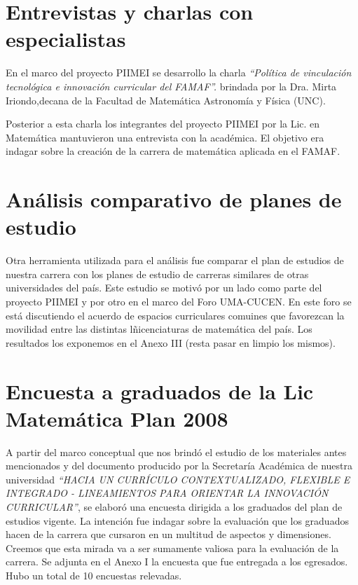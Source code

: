 \documentclass[a4paper,10pt,BCOR10mm,oneside,headsepline]{scrbook}
\begin{document}
\section{Entrevistas y charlas con especialistas}

En el marco del proyecto PIIMEI se desarrollo la charla \emph{“Política de vinculación tecnológica e innovación curricular del FAMAF”. } brindada por la Dra. Mirta Iriondo,decana de la Facultad de Matemática Astronomía y Física (UNC). 

Posterior a esta charla los integrantes del proyecto PIIMEI por la Lic. en Matemática mantuvieron una entrevista con la académica. El objetivo era indagar sobre la creación de la carrera de matemática aplicada en el FAMAF.

\section{Análisis comparativo de planes de estudio}

Otra herramienta utilizada para el análisis fue comparar el plan de estudios de nuestra carrera con los planes de estudio de carreras similares de otras universidades del país. Este estudio se motivó por un lado  como parte del proyecto PIIMEI y por otro en el marco del Foro UMA-CUCEN. En este foro se está discutiendo el acuerdo de espacios curriculares comuines que favorezcan la movilidad entre las distintas lñicenciaturas de matemática del país. Los resultados los exponemos en el Anexo III (resta pasar en limpio los mismos).


\section{Encuesta a graduados de la Lic Matemática Plan 2008}

A partir del marco conceptual que nos brindó el estudio de los materiales antes mencionados 
y del documento producido por la  Secretaría Académica de nuestra universidad \emph{``HACIA UN CURRÍCULO CONTEXTUALIZADO,
FLEXIBLE E INTEGRADO
- LINEAMIENTOS PARA ORIENTAR LA INNOVACIÓN CURRICULAR''}, se elaboró una encuesta dirigida a los graduados del plan de estudios vigente. La intención fue indagar sobre la evaluación que los graduados hacen de la carrera que cursaron en un multitud de aspectos y dimensiones. Creemos que esta mirada va a ser sumamente valiosa para la evaluación de la carrera. Se adjunta en el Anexo I la encuesta que fue entregada a los egresados. Hubo un total de 10 encuestas relevadas.
\end{document}
